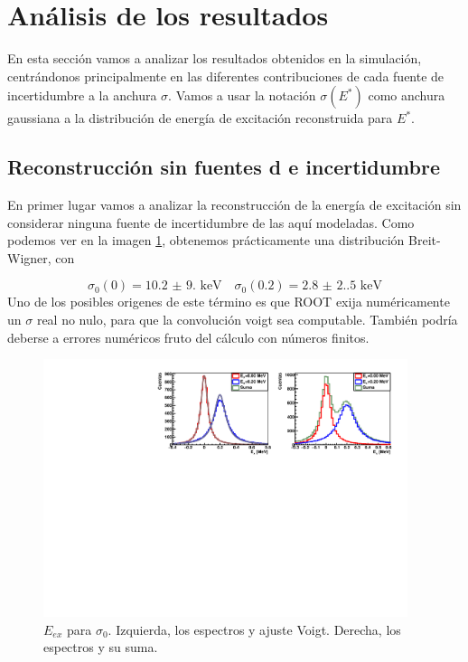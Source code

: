 \section{Análisis de los resultados}

En esta sección vamos a analizar los resultados obtenidos en la simulación, centrándonos principalmente en las diferentes contribuciones de cada fuente de incertidumbre a la anchura $\sigma$.  Vamos a usar la notación $\sigma(E^*)$ como anchura gaussiana a la distribución de energía de excitación reconstruida para $E^*$.  


\subsection{Reconstrucción sin fuentes d e incertidumbre}

En primer lugar vamos a analizar la reconstrucción de la energía de excitación sin considerar ninguna fuente de incertidumbre de las aquí modeladas. Como podemos ver en la imagen \cref{Fig:05-RecExcIdx3}, obtenemos prácticamente una distribución Breit-Wigner, con 

\begin{equation}
    \sigma_{0} (0) = \num{10.2(9.0)} \text{ keV} \quad 
    \sigma_{0} (0.2) = \num{2.8(2.5)} \text{ keV}
\end{equation} 
Uno de los posibles origenes de este término es que ROOT exija numéricamente un $\sigma$ real no nulo, para que la convolución voigt sea computable. También podría deberse a errores numéricos fruto del cálculo con números finitos. 

\vspace*{-0.25cm}
\begin{figure}[H]
    \centering
    \includegraphics[width=0.95\textwidth]{Imagenes/Rec_incIdx3_single.pdf}
    \caption{$E_{ex}$ para $\sigma_{0}$. Izquierda, los espectros y ajuste Voigt. Derecha, los espectros y su suma.}
    \label{Fig:05-RecExcIdx3}
\end{figure}

